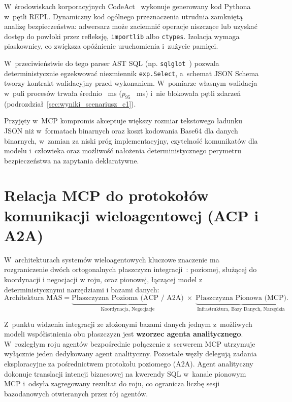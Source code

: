 W~środowiskach korporacyjnych CodeAct~\cite{wang2024codeact} wykonuje generowany kod Pythona w~pętli REPL. Dynamiczny kod ogólnego przeznaczenia utrudnia zamkniętą analizę bezpieczeństwa: adwersarz może zaciemnić operacje niszczące lub uzyskać dostęp do powłoki przez refleksję, \texttt{importlib} albo \texttt{ctypes}. Izolacja wymaga piaskownicy, co zwiększa opóźnienie uruchomienia i~zużycie pamięci.

W~przeciwieństwie do tego parser AST SQL (np. \texttt{sqlglot}~\cite{sqlglot}) pozwala deterministycznie egzekwować niezmiennik \texttt{exp.Select}, a~schemat JSON Schema tworzy kontrakt walidacyjny przed wykonaniem. W~pomiarze własnym walidacja w~puli procesów trwała średnio \wynLatAnalytic~ms ($p_{95}$ \wynLatPpp~ms) i~nie blokowała pętli zdarzeń (podrozdział~\ref{sec:wyniki_scenariusz_c1}).

Przyjęty w~MCP kompromis akceptuje większy rozmiar tekstowego ładunku JSON niż w~formatach binarnych oraz koszt kodowania Base64 dla danych binarnych, w~zamian za niski próg implementacyjny, czytelność komunikatów dla modelu i~człowieka oraz możliwość nałożenia deterministycznego perymetru bezpieczeństwa na zapytania deklaratywne.


\section{Relacja MCP do protokołów komunikacji wieloagentowej (ACP i A2A)}
\label{sec:protokoly_relacja_mcp_a2a}

W~architekturach systemów wieloagentowych kluczowe znaczenie ma rozgraniczenie dwóch ortogonalnych płaszczyzn integracji~\cite{survey_agent_interoperability_2025}: poziomej, służącej do koordynacji i negocjacji w roju, oraz pionowej, łączącej model z deterministycznymi narzędziami i bazami danych:
\begin{equation}
    \text{Architektura MAS} = \underbrace{\text{Płaszczyzna Pozioma (ACP / A2A)}}_{\text{Koordynacja, Negocjacje}} \;\times\; \underbrace{\text{Płaszczyzna Pionowa (MCP)}}_{\text{Infrastruktura, Bazy Danych, Narzędzia}}.
    \label{eq:protokoly_mas_decomposition}
\end{equation}

Z~punktu widzenia integracji ze złożonymi bazami danych jednym z~możliwych modeli współistnienia obu płaszczyzn jest \textbf{wzorzec agenta analitycznego}. W~rozległym roju agentów bezpośrednie połączenie z~serwerem MCP utrzymuje wyłącznie jeden dedykowany agent analityczny. Pozostałe węzły delegują zadania eksploracyjne za pośrednictwem protokołu poziomego (A2A). Agent analityczny dokonuje translacji intencji biznesowej na kwerendy SQL w~kanale pionowym MCP i~odsyła zagregowany rezultat do roju, co ogranicza liczbę sesji bazodanowych otwieranych przez rój agentów.



